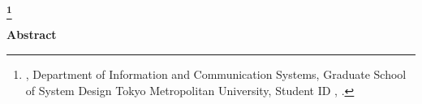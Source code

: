 \newpage
\begin{center}
 \renewcommand{\thefootnote}{\fnsymbol{footnote}}
 \Large\bfseries \etitle\footnote[1]
 {{\edoctitle}, Department of Information and Communication Systems,
 Graduate School of System Design
 Tokyo Metropolitan University,
 {Student ID \studentnumber}, \edate.}
 \renewcommand{\thefootnote}{\arabic{footnote}}
\end{center}
\vspace*{1truemm}
\begin{center}
 \large\eauthor
\end{center}
\vspace*{2truemm}
\begin{center}
 {\bfseries Abstract}
\end{center}
\vspace*{2truemm}
\par
\eabstract

